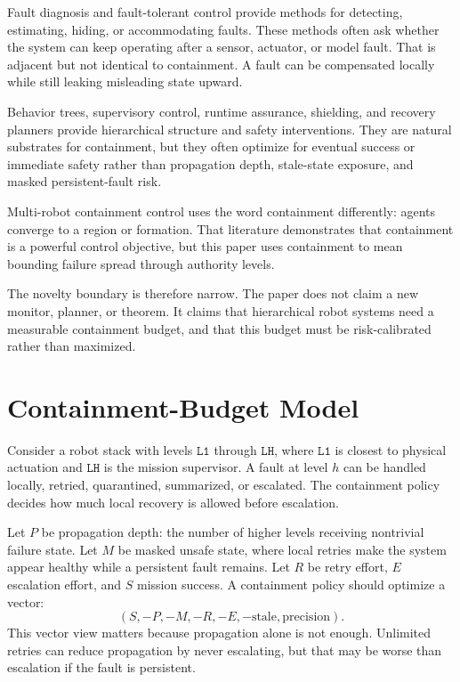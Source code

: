 \documentclass{article}
\newcommand{\level}[1]{\texttt{L#1}}
\begin{document}
Fault diagnosis and fault-tolerant control provide methods for detecting, estimating, hiding, or accommodating faults. These methods often ask whether the system can keep operating after a sensor, actuator, or model fault. That is adjacent but not identical to containment. A fault can be compensated locally while still leaking misleading state upward.

Behavior trees, supervisory control, runtime assurance, shielding, and recovery planners provide hierarchical structure and safety interventions. They are natural substrates for containment, but they often optimize for eventual success or immediate safety rather than propagation depth, stale-state exposure, and masked persistent-fault risk.

Multi-robot containment control uses the word containment differently: agents converge to a region or formation. That literature demonstrates that containment is a powerful control objective, but this paper uses containment to mean bounding failure spread through authority levels.

The novelty boundary is therefore narrow. The paper does not claim a new monitor, planner, or theorem. It claims that hierarchical robot systems need a measurable containment budget, and that this budget must be risk-calibrated rather than maximized.

\section{Containment-Budget Model}

Consider a robot stack with levels $\level{1}$ through $\level{H}$, where $\level{1}$ is closest to physical actuation and $\level{H}$ is the mission supervisor. A fault at level $h$ can be handled locally, retried, quarantined, summarized, or escalated. The containment policy decides how much local recovery is allowed before escalation.

Let $P$ be propagation depth: the number of higher levels receiving nontrivial failure state. Let $M$ be masked unsafe state, where local retries make the system appear healthy while a persistent fault remains. Let $R$ be retry effort, $E$ escalation effort, and $S$ mission success. A containment policy should optimize a vector:
\[
    (S, -P, -M, -R, -E, -\mathrm{stale}, \mathrm{precision}).
\]
This vector view matters because propagation alone is not enough. Unlimited retries can reduce propagation by never escalating, but that may be worse than escalation if the fault is persistent.
\end{document}
